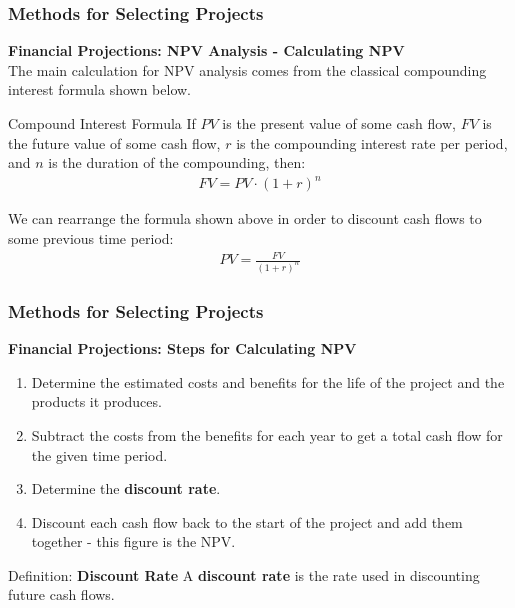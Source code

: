 \documentclass{beamer}
\begin{document}
\begin{frame}
\frametitle{Methods for Selecting Projects}
\textbf{Financial Projections: NPV Analysis - Calculating NPV}\\
\vspace{0.5cm}
The main calculation for NPV analysis comes from the classical compounding interest formula shown below.
\vspace{0.2cm}
\begin{block}{Compound Interest Formula}
If $PV$ is the present value of some cash flow, $FV$ is the future value of some cash flow, $r$ is the compounding interest rate per period, and $n$ is the duration of the compounding, then:
\begin{align*}
FV = PV \cdot (1 + r)^n
\end{align*}
\end{block}
\vspace{0.2cm}
We can rearrange the formula shown above in order to discount cash flows to some previous time period:
\begin{align*}
PV = \frac{FV}{(1+r)^n}
\end{align*}
\end{frame}
\begin{frame}
\frametitle{Methods for Selecting Projects}
\textbf{Financial Projections: Steps for Calculating NPV}\\
\vspace{0.5cm}
\begin{enumerate}
\item Determine the estimated costs and benefits for the life of the project and the products it produces.
\item Subtract the costs from the benefits for each year to get a total cash flow for the given time period.
\item Determine the \textbf{discount rate}.
\item Discount each cash flow back to the start of the project and add them together - this figure is the NPV.
\end{enumerate}
\vspace{0.5cm}
\begin{block}{Definition: \textbf{Discount Rate}}
A \textbf{discount rate} is the rate used in discounting future cash flows.
\end{block}
\end{frame}
\end{document}
